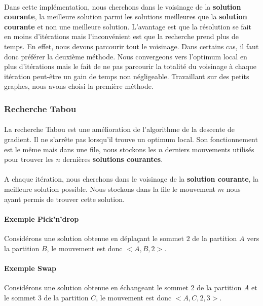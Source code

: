 \documentclass[12pt]{article}
\begin{document}
\paragraph{}Dans cette implémentation, nous cherchons dans le voisinage de la \textbf{solution courante}, la meilleure solution parmi les solutions meilleures que la \textbf{solution courante} et non une meilleure solution.
L'avantage est que la résolution se fait en moins d'itérations mais l'inconvénient est que la recherche prend plus de temps. En effet, nous devons parcourir tout le voisinage.
Dans certains cas, il faut donc préférer la deuxième méthode. 
Nous convergeons vers l'optimum local en plus d'itérations mais le fait de ne pas parcourir la totalité du voisinage à chaque itération peut-être un gain de temps non négligeable.
Travaillant sur des petits graphes, nous avons choisi la première méthode.

\subsubsection{Recherche Tabou}

\paragraph{}La recherche Tabou est une amélioration de l'algorithme de la descente de gradient. Il ne s'arrête pas lorsqu'il trouve un optimum local.
Son fonctionnement est le même mais dans une file, nous stockons les $n$ derniers mouvements utilisés pour trouver les $n$ dernières \textbf{solutions courantes}.

\paragraph{}A chaque itération, nous cherchons dans le voisinage de la \textbf{solution courante}, la meilleure solution possible.
Nous stockons dans la file le mouvement $m$ nous ayant permis de trouver cette solution.

\paragraph{Exemple Pick'n'drop} Considérons une solution obtenue en déplaçant le sommet $2$ de la partition $A$ vers la partition $B$, le mouvement est donc $<A,B,2>$.

\paragraph{Exemple Swap} Considérons une solution obtenue en échangeant le sommet $2$ de la partition $A$ et le sommet $3$ de la partition $C$, le mouvement est donc $<A,C,2,3>$.
\end{document}
